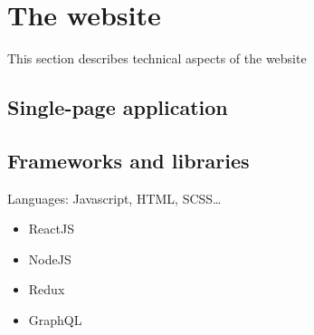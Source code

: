 \section{The website}
\label{sec:website}

This section describes technical aspects of the website

\subsection{Single-page application}
\label{ssec:spa}

\subsection{Frameworks and libraries}
\label{ssec:frameworks}

Languages: Javascript, HTML, SCSS\ldots

\begin{itemize}
    \item ReactJS
    \item NodeJS
    \item Redux
    \item GraphQL
\end{itemize}
